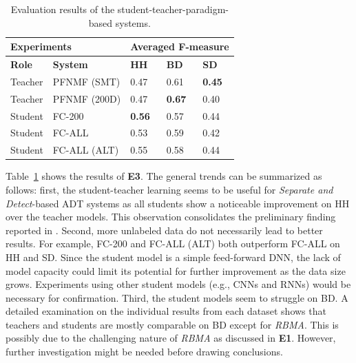 \documentclass{article}
\newcommand{\comment}[1]{{\textcolor{blue}{#1}}}
\begin{document}
\begin{table}[]
\centering
\footnotesize
\begin{tabularx}{\columnwidth}{XXXXX}
\hline
\multicolumn{2}{l}{\textbf{Experiments}}                    & \multicolumn{3}{l}{\textbf{Averaged F-measure}} \\ \hline
\textbf{Role} & \multicolumn{1}{l|}{\textbf{System}}        & \textbf{HH}    & \textbf{BD}    & \textbf{SD}   \\ \hline
Teacher       & \multicolumn{1}{l|}{PFNMF (SMT)}            & 0.47           & 0.61           & \textbf{0.45} \\
Teacher       & \multicolumn{1}{l|}{PFNMF (200D)}           & 0.47           & \textbf{0.67}  & 0.40          \\
Student       & \multicolumn{1}{l|}{FC-200}                & \textbf{0.56}  & 0.57           & 0.44          \\
Student       & \multicolumn{1}{l|}{FC-ALL}               & 0.53           & 0.59           & 0.42          \\
Student       & \multicolumn{1}{l|}{FC-ALL (ALT)} & 0.55           & 0.58           & 0.44          \\ \hline
\end{tabularx}
\caption{Evaluation results of the student-teacher-paradigm-based systems.}%
\label{tab:e3result}
\end{table}


Table~\ref{tab:e3result} shows the results of \textbf{E3}. The general trends can be summarized as follows: first, the student-teacher learning seems to be useful for \textit{Separate and Detect}-based ADT systems as all students show a noticeable improvement on HH over the teacher models. This observation consolidates the preliminary finding reported in \cite{Wu2017}. Second, more unlabeled data do not necessarily lead to better results. For example, FC-200 and FC-ALL (ALT) both outperform FC-ALL on HH and SD. 
Since the student model is a simple feed-forward DNN, the lack of model capacity could limit its potential for further improvement as the data size grows. Experiments using other student models (e.g., CNNs and RNNs) would be necessary for confirmation.   
Third, the student models seem to struggle on BD. A detailed examination on the individual results from each dataset shows that teachers and students are mostly comparable on BD except for \textit{RBMA}. This is possibly due to the challenging nature of \textit{RBMA} as discussed in \textbf{E1}. However, further investigation might be needed before drawing conclusions. %
\end{document}
